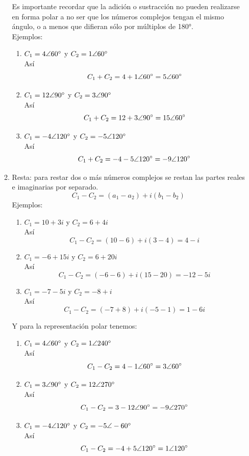 \documentclass[a4paper,12pt]{article}
\begin{document}
\begin{enumerate}
\begin{enumerate}
	Es importante recordar que la adición o sustracción no pueden realizarse en forma polar a no ser que los números complejos tengan el mismo ángulo, o a menos que difieran sólo por múltiplos de 180°. \\

	Ejemplos:\\
		\begin{enumerate}
			\item $C_1 = 4 \angle 60\degree$ y $C_2 = 1 \angle 60\degree$ \\
			Así \[C_1 + C_2 = 4+1 \angle 60\degree = 5 \angle 60\degree \]
			\item $C_1 = 12 \angle 90\degree$ y $C_2 = 3 \angle 90\degree$ \\
			Así \[C_1 + C_2 = 12+3 \angle 90\degree = 15 \angle 60\degree \]
			\item $C_1 = -4 \angle 120\degree$ y $C_2 = -5 \angle 120\degree$ \\
			Así \[C_1 + C_2 = -4-5 \angle 120\degree = -9 \angle 120\degree \]
		\end{enumerate}



	\item Resta: para restar dos o más números complejos se restan las partes reales e imaginarias por separado.
		\[C_1 - C_2 = (a_1 - a_2) + i(b_1 - b_2)\]
		Ejemplos:\\
		\begin{enumerate}
			\item $C_1 = 10+3i$ y $C_2 = 6+4i$ \\
			Así \[C_1 - C_2 = (10-6) + i(3-4) = 4 - i\]
			\item $C_1 = -6+15i$ y $C_2 = 6+20i$ \\
			Así \[C_1 - C_2 = (-6 -6) + i(15-20) = -12 -5i\]
			\item $C_1 = -7-5i$ y $C_2 = -8+i$ \\
			Así \[C_1 - C_2 = (-7+8) + i(-5-1) = 1 - 6i\]
		\end{enumerate}
	Y para la representación polar tenemos:\\
		\begin{enumerate}
			\item $C_1 = 4 \angle 60\degree$ y $C_2 = 1 \angle 240\degree$ \\
			Así \[C_1 - C_2 = 4-1 \angle 60\degree = 3 \angle 60\degree \]
			\item $C_1 = 3 \angle 90\degree$ y $C_2 = 12 \angle 270\degree$ \\
			Así \[C_1 - C_2 = 3-12 \angle 90\degree = -9 \angle 270\degree \]
			\item $C_1 = -4 \angle 120\degree$ y $C_2 = -5 \angle -60\degree$ \\
			Así \[C_1 - C_2 = -4+5 \angle 120\degree = 1 \angle 120\degree \]
		\end{enumerate}


\end{enumerate}
\end{enumerate}
\end{document}
